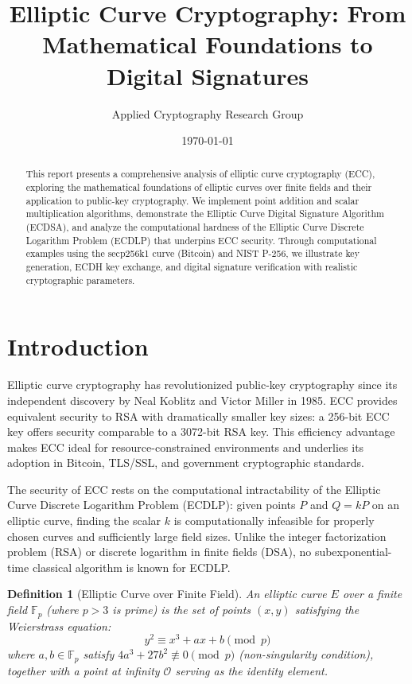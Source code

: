 \documentclass[a4paper, 11pt]{article}
\title{Elliptic Curve Cryptography: From Mathematical Foundations to Digital Signatures}
\author{Applied Cryptography Research Group}
\date{\today}
\newtheorem{definition}{Definition}[section]
\begin{document}
\maketitle

\begin{abstract}
This report presents a comprehensive analysis of elliptic curve cryptography (ECC), exploring the mathematical foundations of elliptic curves over finite fields and their application to public-key cryptography. We implement point addition and scalar multiplication algorithms, demonstrate the Elliptic Curve Digital Signature Algorithm (ECDSA), and analyze the computational hardness of the Elliptic Curve Discrete Logarithm Problem (ECDLP) that underpins ECC security. Through computational examples using the secp256k1 curve (Bitcoin) and NIST P-256, we illustrate key generation, ECDH key exchange, and digital signature verification with realistic cryptographic parameters.
\end{abstract}

\section{Introduction}

Elliptic curve cryptography has revolutionized public-key cryptography since its independent discovery by Neal Koblitz and Victor Miller in 1985. ECC provides equivalent security to RSA with dramatically smaller key sizes: a 256-bit ECC key offers security comparable to a 3072-bit RSA key. This efficiency advantage makes ECC ideal for resource-constrained environments and underlies its adoption in Bitcoin, TLS/SSL, and government cryptographic standards.

The security of ECC rests on the computational intractability of the Elliptic Curve Discrete Logarithm Problem (ECDLP): given points $P$ and $Q = kP$ on an elliptic curve, finding the scalar $k$ is computationally infeasible for properly chosen curves and sufficiently large field sizes. Unlike the integer factorization problem (RSA) or discrete logarithm in finite fields (DSA), no subexponential-time classical algorithm is known for ECDLP.

\begin{definition}[Elliptic Curve over Finite Field]
An elliptic curve $E$ over a finite field $\mathbb{F}_p$ (where $p > 3$ is prime) is the set of points $(x, y)$ satisfying the Weierstrass equation:
\begin{equation}
y^2 \equiv x^3 + ax + b \pmod{p}
\end{equation}
where $a, b \in \mathbb{F}_p$ satisfy $4a^3 + 27b^2 \not\equiv 0 \pmod{p}$ (non-singularity condition), together with a point at infinity $\mathcal{O}$ serving as the identity element.
\end{definition}
\end{document}
